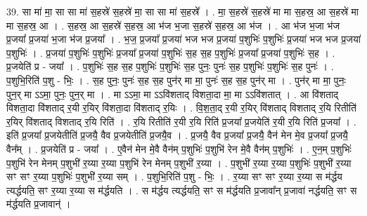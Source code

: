 \documentclass[17pt]{extarticle}
\begin{document}
39. सा मा॑ मा॒ सा सा मा॑ स॒हस्रे॑ स॒हस्रे॑ मा॒ सा सा मा॑ स॒हस्रे᳚ । . मा॒ स॒हस्रे॑ स॒हस्रे॑ मा मा स॒हस्र॒ आ स॒हस्रे॑ मा मा स॒हस्र॒ आ । . स॒हस्र॒ आ स॒हस्रे॑ स॒हस्र॒ आ भ॑ज भ॒जा स॒हस्रे॑ स॒हस्र॒ आ भ॑ज । . आ भ॑ज भ॒जा भ॑ज प्र॒जया᳚ प्र॒जया॑ भ॒जा भ॑ज प्र॒जया᳚ । . भ॒ज॒ प्र॒जया᳚ प्र॒जया॑ भज भज प्र॒जया॑ प॒शुभिः॑ प॒शुभिः॑ प्र॒जया॑ भज भज प्र॒जया॑ प॒शुभिः॑ । . प्र॒जया॑ प॒शुभिः॑ प॒शुभिः॑ प्र॒जया᳚ प्र॒जया॑ प॒शुभिः॑ स॒ह स॒ह प॒शुभिः॑ प्र॒जया᳚ प्र॒जया॑ प॒शुभिः॑ स॒ह । . प्र॒जयेति॑ प्र - जया᳚ । . प॒शुभिः॑ स॒ह स॒ह प॒शुभिः॑ प॒शुभिः॑ स॒ह पुनः॒ पुनः॑ स॒ह प॒शुभिः॑ प॒शुभिः॑ स॒ह पुनः॑ । . प॒शुभि॒रिति॑ प॒शु - भिः॒ । . स॒ह पुनः॒ पुनः॑ स॒ह स॒ह पुन॑र् मा मा॒ पुनः॑ स॒ह स॒ह पुन॑र् मा । . पुन॑र् मा मा॒ पुनः॒ पुन॒र् मा ऽऽमा॒ पुनः॒ पुन॒र् मा । . मा ऽऽमा॒ मा ऽऽवि॑शताद् विशता॒दा मा॒ मा ऽऽवि॑शतात् । . आ वि॑शताद् विशता॒दा वि॑शताद् र॒यी र॒यिर् वि॑शता॒दा वि॑शताद् र॒यिः । . वि॒श॒ता॒द् र॒यी र॒यिर् वि॑शताद् विशताद् र॒यि रितीति॑ र॒यिर् वि॑शताद् विशताद् र॒यि रिति॑ । . र॒यि रितीति॑ र॒यी र॒यि रिति॑ प्र॒जया᳚ प्र॒जयेति॑ र॒यी र॒यि रिति॑ प्र॒जया᳚ । . इति॑ प्र॒जया᳚ प्र॒जयेतीति॑ प्र॒जयै॒ वैव प्र॒जयेतीति॑ प्र॒जयै॒व । . प्र॒जयै॒ वैव प्र॒जया᳚ प्र॒जयै॒ वैन॑ मेन मे॒व प्र॒जया᳚ प्र॒जयै॒ वैन᳚म् । . प्र॒जयेति॑ प्र - जया᳚ । . ए॒वैन॑ मेन मे॒वै वैन॑म् प॒शुभिः॑ प॒शुभि॑ रेन मे॒वै वैन॑म् प॒शुभिः॑ । . ए॒न॒म् प॒शुभिः॑ प॒शुभि॑ रेन मेनम् प॒शुभी॑ र॒य्या र॒य्या प॒शुभि॑ रेन मेनम् प॒शुभी॑ र॒य्या । . प॒शुभी॑ र॒य्या र॒य्या प॒शुभिः॑ प॒शुभी॑ र॒य्या सꣳ सꣳ र॒य्या प॒शुभिः॑ प॒शुभी॑ र॒य्या सम् । . प॒शुभि॒रिति॑ प॒शु - भिः॒ । . र॒य्या सꣳ सꣳ र॒य्या र॒य्या स म॑र्द्धय त्यर्द्धयति॒ सꣳ र॒य्या र॒य्या स म॑र्द्धयति । . स म॑र्द्धय त्यर्द्धयति॒ सꣳ स म॑र्द्धयति प्र॒जावा᳚न् प्र॒जावा॑ नर्द्धयति॒ सꣳ स म॑र्द्धयति प्र॒जावान्॑ । \newline
\pagebreak
{}
\end{document}
